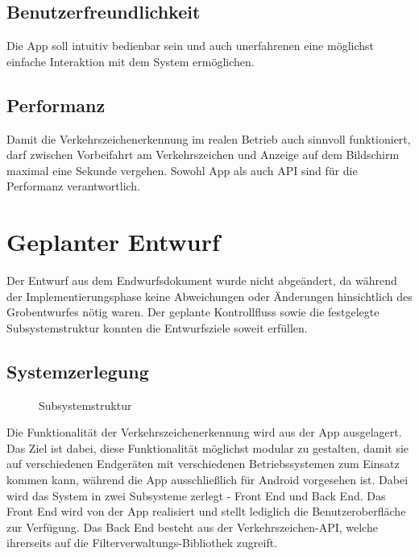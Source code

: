 \documentclass[12pt,a4paper,ngerman,enabledeprecatedfontcommands]{scrreprt}
\begin{document}
\section{Benutzerfreundlichkeit} Die \gls{App} soll intuitiv bedienbar sein und auch unerfahrenen  eine möglichst einfache Interaktion mit dem \gls{System} ermöglichen.\\

\section{Performanz} Damit die Verkehrszeichenerkennung im realen Betrieb auch sinnvoll funktioniert, darf zwischen Vorbeifahrt am Verkehrszeichen und Anzeige auf dem Bildschirm maximal eine Sekunde vergehen. Sowohl \gls{App} als auch \gls{API} sind für die Performanz verantwortlich.\\

\chapter{Geplanter Entwurf}
Der Entwurf aus dem Endwurfsdokument wurde nicht abgeändert, da während der
Implementierungsphase keine Abweichungen oder Änderungen hinsichtlich des Grobentwurfes nötig waren. Der geplante Kontrollfluss sowie die festgelegte Subsystemstruktur konnten die Entwurfsziele soweit erfüllen.
\section{Systemzerlegung}

\begin{figure}[H]
\centering

\caption{Subsystemstruktur}
\end{figure}
\label{sec:subsystemstruktur}

Die Funktionalität der Verkehrszeichenerkennung wird aus der \gls{App} ausgelagert. Das Ziel ist dabei, diese Funktionalität möglichst modular zu gestalten, damit sie auf verschiedenen Endgeräten mit verschiedenen Betriebssystemen zum Einsatz kommen kann, während die \gls{App} ausschließlich für Android vorgesehen ist. Dabei wird das \gls{System} in zwei Subsysteme zerlegt - Front End und Back End. Das Front End wird von der \gls{App} realisiert und stellt lediglich die Benutzeroberfläche zur Verfügung. Das Back End besteht aus der \gls{Verkehrszeichen-API}, welche ihrerseits auf die  \gls{Filterverwaltungs-Bibliothek}  zugreift. 
\end{document}
